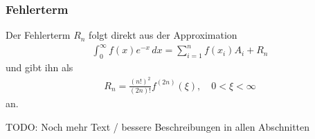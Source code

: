 \subsubsection{Fehlerterm}
Der Fehlerterm $R_n$ folgt direkt aus der Approximation
\begin{align*}
\int_0^{\infty} f(x) e^{-x} \, dx
=
\sum_{i=1}^n f(x_i) A_i + R_n
\end{align*}
und \cite{abramowitz+stegun} gibt ihn als
\begin{align}
R_n
=
\frac{(n!)^2}{(2n)!} f^{(2n)}(\xi)
,\quad
0 < \xi < \infty
\label{laguerre:lag_error}
\end{align}
an.

{
\large \color{red}
TODO:
Noch mehr Text / bessere Beschreibungen in allen Abschnitten
}
